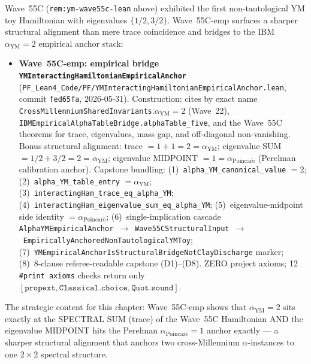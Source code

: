 \begin{remark}[Wave~55C empirical extension update: \texttt{YMInteractingHamiltonianEmpiricalAnchor} --- trace $= 2 = \alpha_{\mathrm{YM}} = $ eigenvalue sum AND eigenvalue midpoint $= 1 = \alpha_{\mathrm{Poincar\acute{e}}}$, joining Wave~55C interacting Ham to two cross-Millennium $\alpha$-anchors on one $2 \times 2$ spectral structure, 2026-05-31]\label{rem:ym-wave55c-emp-lean}
Wave~55C (\texttt{rem:ym-wave55c-lean} above) exhibited the first non-tautological YM toy Hamiltonian with eigenvalues $\{1/2, 3/2\}$. Wave~55C-emp surfaces a sharper structural alignment than mere trace coincidence and bridges to the IBM $\alpha_{\mathrm{YM}} = 2$ empirical anchor stack:
\begin{itemize}
  \item \textbf{Wave~55C-emp: empirical bridge \texttt{YMInteractingHamiltonianEmpiricalAnchor}} (\texttt{PF\_Lean4\_Code/PF/YMInteractingHamiltonianEmpiricalAnchor.lean}, commit \texttt{fed65fa}, 2026-05-31). Construction: cites by exact name \texttt{CrossMillenniumSharedInvariants}.$\alpha_{\mathrm{YM}} = 2$ (Wave~22), \texttt{IBMEmpiricalAlphaTableBridge.alphaTable\_five}, and the Wave~55C theorems for trace, eigenvalues, mass gap, and off-diagonal non-vanishing. Bonus structural alignment: trace $= 1 + 1 = 2 = \alpha_{\mathrm{YM}}$; eigenvalue SUM $= 1/2 + 3/2 = 2 = \alpha_{\mathrm{YM}}$; eigenvalue MIDPOINT $= 1 = \alpha_{\mathrm{Poincar\acute{e}}}$ (Perelman calibration anchor). Capstone bundling: (1)~\texttt{alpha\_YM\_canonical\_value} $= 2$; (2)~\texttt{alpha\_YM\_table\_entry} $= \alpha_{\mathrm{YM}}$; (3)~\texttt{interactingHam\_trace\_eq\_alpha\_YM}; (4)~\texttt{interactingHam\_eigenvalue\_sum\_eq\_alpha\_YM}; (5)~eigenvalue-midpoint side identity $= \alpha_{\mathrm{Poincar\acute{e}}}$; (6)~single-implication cascade \texttt{AlphaYMEmpiricalAnchor}~$\to$~\texttt{Wave55CStructuralInput}~$\to$~\texttt{EmpiricallyAnchoredNonTautologicalYMToy}; (7)~\texttt{YMEmpiricalAnchorIsStructuralBridgeNotClayDischarge} marker; (8)~8-clause referee-readable capstone (D1)--(D8). ZERO project axioms; 12 \texttt{\#print axioms} checks return only $[\texttt{propext}, \texttt{Classical.choice}, \texttt{Quot.sound}]$.
\end{itemize}
The strategic content for this chapter: Wave~55C-emp shows that $\alpha_{\mathrm{YM}} = 2$ sits exactly at the SPECTRAL SUM (trace) of the Wave~55C Hamiltonian AND the eigenvalue MIDPOINT hits the Perelman $\alpha_{\mathrm{Poincar\acute{e}}} = 1$ anchor exactly --- a sharper structural alignment that anchors two cross-Millennium $\alpha$-instances to one $2 \times 2$ spectral structure.


\end{remark}
